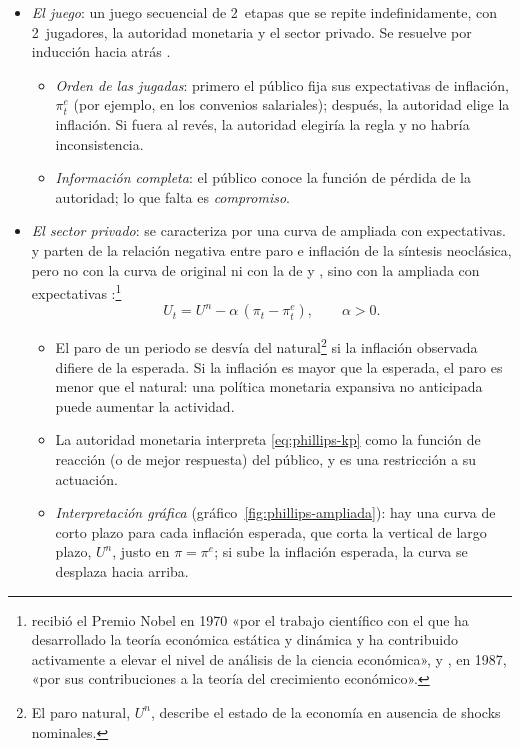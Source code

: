 \documentclass[11pt]{article}
\begin{document}
\begin{itemize}
\item \emph{El juego}: un juego secuencial de 2~etapas que se repite indefinidamente, con 2~jugadores, la autoridad monetaria y el sector privado. Se resuelve por inducción hacia atrás .
  \begin{itemize}
  \item \emph{Orden de las jugadas}: primero el público fija sus expectativas de inflación, $\pi^e_t$ (por ejemplo, en los convenios salariales); después, la autoridad elige la inflación. Si fuera al revés, la autoridad elegiría la regla y no habría inconsistencia.
  \item \emph{Información completa}: el público conoce la función de pérdida de la autoridad; lo que falta es \emph{compromiso}.
  \end{itemize}
\item \emph{El sector privado}: se caracteriza por una curva de  ampliada con expectativas.  y  parten de la relación negativa entre paro e inflación de la síntesis neoclásica, pero no con la curva de  original ni con la de  y , sino con la ampliada con expectativas :\footnote{ recibió el Premio Nobel en 1970 «por el trabajo científico con el que ha desarrollado la teoría económica estática y dinámica y ha contribuido activamente a elevar el nivel de análisis de la ciencia económica»\nocite{Nobel1970Samuelson}, y , en 1987, «por sus contribuciones a la teoría del crecimiento económico»\nocite{Nobel1987Solow}.}
  \begin{equation}\label{eq:phillips-kp}
  U_t=U^n-\alpha\,(\pi_t-\pi^e_t),\qquad \alpha>0 .
  \end{equation}
  \begin{itemize}
  \item El paro de un periodo se desvía del natural\footnote{El paro natural, $U^n$, describe el estado de la economía en ausencia de shocks nominales.} si la inflación observada difiere de la esperada. Si la inflación es mayor que la esperada, el paro es menor que el natural: una política monetaria expansiva no anticipada puede aumentar la actividad.
  \item La autoridad monetaria interpreta \eqref{eq:phillips-kp} como la función de reacción (o de mejor respuesta) del público, y es una restricción a su actuación.
  \item \emph{Interpretación gráfica} (gráfico~\ref{fig:phillips-ampliada}): hay una curva de corto plazo para cada inflación esperada, que corta la vertical de largo plazo, $U^n$, justo en $\pi=\pi^e$; si sube la inflación esperada, la curva se desplaza hacia arriba.
  \end{itemize}
\end{itemize}
\end{document}
